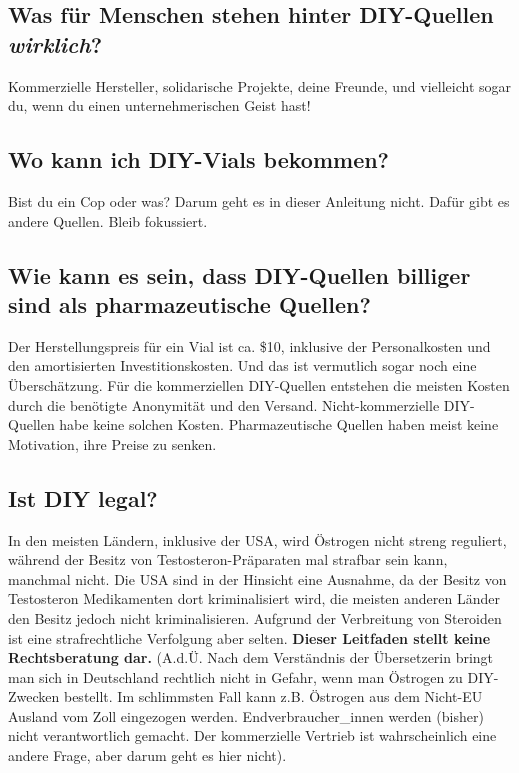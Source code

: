\documentclass{article}
\begin{document}
\subsection{Was für Menschen stehen hinter DIY-Quellen \textit{wirklich}?}

Kommerzielle Hersteller, solidarische Projekte, deine Freunde, und vielleicht sogar du, wenn du einen unternehmerischen Geist hast!

\subsection{Wo kann ich DIY-Vials bekommen?}

Bist du ein Cop oder was? Darum geht es in dieser Anleitung nicht. Dafür gibt es andere Quellen. Bleib fokussiert.

\subsection{Wie kann es sein, dass DIY-Quellen billiger sind als pharmazeutische Quellen?}

Der Herstellungspreis für ein Vial ist ca. \$10, inklusive der Personalkosten und den amortisierten Investitionskosten. Und das ist vermutlich sogar noch eine Überschätzung. Für die kommerziellen DIY-Quellen entstehen die meisten Kosten durch die benötigte Anonymität und den Versand. Nicht-kommerzielle DIY-Quellen habe keine solchen Kosten. Pharmazeutische Quellen haben meist keine Motivation, ihre Preise zu senken.

\subsection{Ist DIY legal?}\label{6-11}

In den meisten Ländern, inklusive der USA, wird Östrogen nicht streng reguliert, während der Besitz von Testosteron-Präparaten mal strafbar sein kann, manchmal nicht. Die USA sind in der Hinsicht eine Ausnahme, da der Besitz von Testosteron Medikamenten dort kriminalisiert wird, die meisten anderen Länder den Besitz jedoch nicht kriminalisieren. Aufgrund der Verbreitung von Steroiden ist eine strafrechtliche Verfolgung aber selten. \textbf{Dieser Leitfaden stellt keine Rechtsberatung dar.}
(A.d.Ü. Nach dem Verständnis der Übersetzerin bringt man sich in Deutschland rechtlich nicht in Gefahr, wenn man Östrogen zu DIY-Zwecken bestellt. Im schlimmsten Fall kann z.B. Östrogen aus dem Nicht-EU Ausland vom Zoll eingezogen werden. Endverbraucher\_innen werden (bisher) nicht verantwortlich gemacht. Der kommerzielle Vertrieb ist wahrscheinlich eine andere Frage, aber darum geht es hier nicht).
\end{document}

